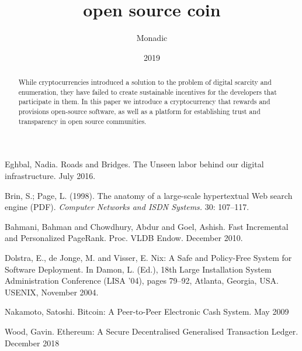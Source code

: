\documentclass[a4paper, oneside, 11pt, draft]{amsart}
\begin{document}
\title[open source coin]{open source coin}
\author{Monadic}
\date{2019}

\begin{abstract}
\small While cryptocurrencies introduced a solution to the problem of digital
scarcity and enumeration, they have failed to create sustainable incentives for
the developers that participate in them.  In this paper we introduce a
cryptocurrency that rewards and provisions open-source software, as well as a
platform for establishing trust and transparency in open source communities.
\end{abstract}

\maketitle

\setlength{\columnsep}{1cm}
\begin{multicols}{2}

\medskip







\end{multicols}

\begin{thebibliography}{9}

 Eghbal, Nadia. Roads and Bridges. The Unseen labor
  behind our digital infrastructure. July 2016.

 Brin, S.; Page, L. (1998). The anatomy of a
  large-scale hypertextual Web search engine (PDF). \emph{Computer Networks
  and ISDN Systems.} 30: 107–117.

 Bahmani, Bahman and Chowdhury, Abdur and Goel,
  Ashish. Fast Incremental and Personalized PageRank. Proc. VLDB
  Endow. December 2010.

 Dolstra, E., de Jonge, M. and Visser, E. Nix: A Safe and
  Policy-Free System for Software Deployment. In Damon, L. (Ed.), 18th Large
  Installation System Administration Conference (LISA '04), pages 79–92, Atlanta,
  Georgia, USA. USENIX, November 2004.

 Nakamoto, Satoshi. Bitcoin: A Peer-to-Peer Electronic Cash
  System. May 2009

 Wood, Gavin. Ethereum: A Secure Decentralised Generalised
  Transaction Ledger. December 2018

\end{thebibliography}
\end{document}
